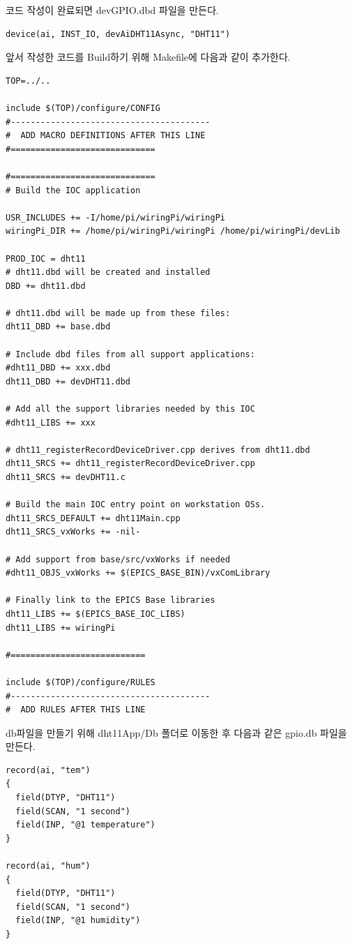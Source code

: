 \documentclass[11pt
  , a4paper
  , article
  , oneside
]{memoir}
\begin{document}
코드 작성이 완료되면 devGPIO.dbd 파일을 만든다.
\begin{lstlisting}[style=termstyle]
device(ai, INST_IO, devAiDHT11Async, "DHT11")
\end{lstlisting}
앞서 작성한 코드를 Build하기 위해 Makefile에 다음과 같이 추가한다.
\begin{lstlisting}[style=termstyle]
TOP=../..

include $(TOP)/configure/CONFIG
#----------------------------------------
#  ADD MACRO DEFINITIONS AFTER THIS LINE
#=============================

#=============================
# Build the IOC application

USR_INCLUDES += -I/home/pi/wiringPi/wiringPi
wiringPi_DIR += /home/pi/wiringPi/wiringPi /home/pi/wiringPi/devLib

PROD_IOC = dht11
# dht11.dbd will be created and installed
DBD += dht11.dbd

# dht11.dbd will be made up from these files:
dht11_DBD += base.dbd

# Include dbd files from all support applications:
#dht11_DBD += xxx.dbd
dht11_DBD += devDHT11.dbd

# Add all the support libraries needed by this IOC
#dht11_LIBS += xxx

# dht11_registerRecordDeviceDriver.cpp derives from dht11.dbd
dht11_SRCS += dht11_registerRecordDeviceDriver.cpp
dht11_SRCS += devDHT11.c

# Build the main IOC entry point on workstation OSs.
dht11_SRCS_DEFAULT += dht11Main.cpp
dht11_SRCS_vxWorks += -nil-

# Add support from base/src/vxWorks if needed
#dht11_OBJS_vxWorks += $(EPICS_BASE_BIN)/vxComLibrary

# Finally link to the EPICS Base libraries
dht11_LIBS += $(EPICS_BASE_IOC_LIBS)
dht11_LIBS += wiringPi

#===========================

include $(TOP)/configure/RULES
#----------------------------------------
#  ADD RULES AFTER THIS LINE
\end{lstlisting}
db파일을 만들기 위해 dht11App/Db 폴더로 이동한 후 다음과 같은 gpio.db 파일을 만든다.
\begin{lstlisting}[style=termstyle]
record(ai, "tem")
{
  field(DTYP, "DHT11")
  field(SCAN, "1 second")
  field(INP, "@1 temperature")
}

record(ai, "hum")
{
  field(DTYP, "DHT11")
  field(SCAN, "1 second")
  field(INP, "@1 humidity")
}
\end{lstlisting}
\end{document}
